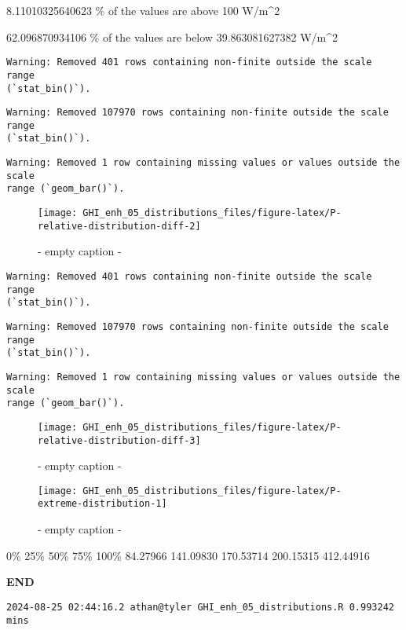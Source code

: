 \documentclass[
  10pt,
  a4paper,oneside]{article}
\begin{document}
8.11010325640623 \% of the values are above 100 W/m\^{}2

62.096870934106 \% of the values are below 39.863081627382 W/m\^{}2

\begin{verbatim}
Warning: Removed 401 rows containing non-finite outside the scale range
(`stat_bin()`).
\end{verbatim}

\begin{verbatim}
Warning: Removed 107970 rows containing non-finite outside the scale range
(`stat_bin()`).
\end{verbatim}

\begin{verbatim}
Warning: Removed 1 row containing missing values or values outside the scale
range (`geom_bar()`).
\end{verbatim}

\begin{figure}[H]

{\centering \texttt{[image: GHI\_enh\_05\_distributions\_files/figure-latex/P-relative-distribution-diff-2]} 

}

\caption{ - empty caption - }\label{fig:P-relative-distribution-diff-2}
\end{figure}

\begin{verbatim}
Warning: Removed 401 rows containing non-finite outside the scale range
(`stat_bin()`).
\end{verbatim}

\begin{verbatim}
Warning: Removed 107970 rows containing non-finite outside the scale range
(`stat_bin()`).
\end{verbatim}

\begin{verbatim}
Warning: Removed 1 row containing missing values or values outside the scale
range (`geom_bar()`).
\end{verbatim}

\begin{figure}[H]

{\centering \texttt{[image: GHI\_enh\_05\_distributions\_files/figure-latex/P-relative-distribution-diff-3]} 

}

\caption{ - empty caption - }\label{fig:P-relative-distribution-diff-3}
\end{figure}
\begin{figure}[H]

{\centering \texttt{[image: GHI\_enh\_05\_distributions\_files/figure-latex/P-extreme-distribution-1]} 

}

\caption{ - empty caption - }\label{fig:P-extreme-distribution}
\end{figure}

0\% 25\% 50\% 75\% 100\%
84.27966 141.09830 170.53714 200.15315 412.44916

\textbf{END}

\begin{verbatim}
2024-08-25 02:44:16.2 athan@tyler GHI_enh_05_distributions.R 0.993242 mins
\end{verbatim}
\end{document}
